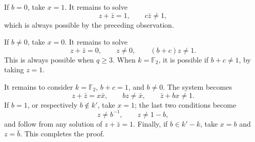 If \(b=0\), take \(x=1\).  It remains to solve
\[
 z+\bar z=1,\qquad c\bar z\ne1,
\]
which is always possible by the preceding observation.

If \(b\ne0\), take \(x=0\).  It remains to solve
\[
 z+\bar z=0,\qquad z\ne0,\qquad (b+c)z\ne1.
\]
This is always possible when \(q\geq3\).  When \(k=\mathbb F_2\), it
is possible if \(b+c\ne1\), by taking \(z=1\).

It remains to consider \(k=\mathbb F_2\), \(b+c=1\), and \(b\ne0\).
The system becomes
\[
 z+\bar z=x\bar x,\qquad bz\ne\bar x,\qquad
 \bar z+bx\ne1.
\]
If \(b=1\), or respectively \(b\notin k'\), take \(x=1\); the last two
conditions become
\[
 z\ne b^{-1},\qquad z\ne1-b,
\]
and follow from any solution of \(z+\bar z=1\).  Finally, if
\(b\in k'-k\), take \(x=b\) and \(z=\bar b\).  This completes the
proof.
\SGAQED
